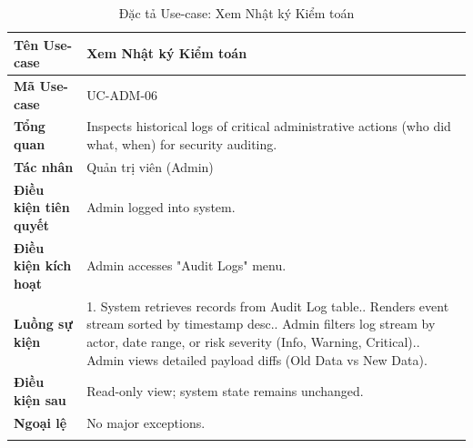 \newpage
\begin{longtable}{|p{3.5cm}|p{11.5cm}|}
    \hline
    \textbf{Tên Use-case} & \textbf{Xem Nhật ký Kiểm toán} \\
    \hline
    \textbf{Mã Use-case} & UC-ADM-06 \\
    \hline
    \textbf{Tổng quan} & Inspects historical logs of critical administrative actions (who did what, when) for security auditing. \\
    \hline
    \textbf{Tác nhân} & Quản trị viên (Admin) \\
    \hline
    \textbf{Điều kiện tiên quyết} & Admin logged into system. \\
    \hline
    \textbf{Điều kiện kích hoạt} & Admin accesses "Audit Logs" menu. \\
    \hline
    \textbf{Luồng sự kiện} & 
    1. System retrieves records from Audit Log table.\newline
    2. Renders event stream sorted by timestamp desc.\newline
    3. Admin filters log stream by actor, date range, or risk severity (Info, Warning, Critical).\newline
    4. Admin views detailed payload diffs (Old Data vs New Data). \\
    \hline
    \textbf{Điều kiện sau} & Read-only view; system state remains unchanged. \\
    \hline
    \textbf{Ngoại lệ} & No major exceptions. \\
    \hline
    \caption{Đặc tả Use-case: Xem Nhật ký Kiểm toán}
\end{longtable}

